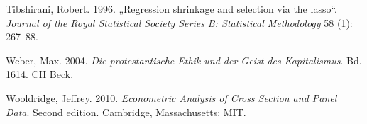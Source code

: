\documentclass[
  a4paper,
  DIV=11,
  oneside]{scrreprt}
\newlength{\cslhangindent}
\newlength{\cslentryspacingunit} %
\newenvironment{CSLReferences}[2] %
 {%
  \setlength{\parindent}{0pt}
  \ifodd #1
  \let\oldpar\par
  \def\par{\hangindent=\cslhangindent\oldpar}
  \fi
  \setlength{\parskip}{#2\cslentryspacingunit}
 }%
 {}
\begin{document}
\begin{CSLReferences}{1}{0}
\leavevmode{}%
Tibshirani, Robert. 1996. {„Regression shrinkage and selection via the
lasso``}. \emph{Journal of the Royal Statistical Society Series B:
Statistical Methodology} 58 (1): 267--88.

\leavevmode{}%
Weber, Max. 2004. \emph{Die protestantische Ethik und der Geist des
Kapitalismus}. Bd. 1614. CH Beck.

\leavevmode{}%
Wooldridge, Jeffrey. 2010. \emph{Econometric Analysis of Cross Section
and Panel Data}. Second edition. Cambridge, Massachusetts: MIT.

\end{CSLReferences}
\end{document}
